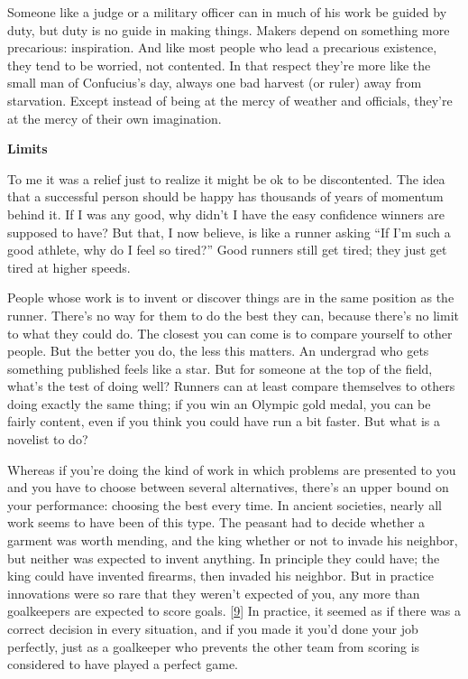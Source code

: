 Someone like a judge or a military officer can in much of his work be
guided by duty, but duty is no guide in making things. Makers depend on
something more precarious: inspiration. And like most people who lead a
precarious existence, they tend to be worried, not contented. In that
respect they're more like the small man of Confucius's day, always one
bad harvest (or ruler) away from starvation. Except instead of being at
the mercy of weather and officials, they're at the mercy of their own
imagination.

\textbf{Limits}

To me it was a relief just to realize it might be ok to be discontented.
The idea that a successful person should be happy has thousands of years
of momentum behind it. If I was any good, why didn't I have the easy
confidence winners are supposed to have? But that, I now believe, is
like a runner asking ``If I'm such a good athlete, why do I feel so
tired?'' Good runners still get tired; they just get tired at higher
speeds.

People whose work is to invent or discover things are in the same
position as the runner. There's no way for them to do the best they can,
because there's no limit to what they could do. The closest you can come
is to compare yourself to other people. But the better you do, the less
this matters. An undergrad who gets something published feels like a
star. But for someone at the top of the field, what's the test of doing
well? Runners can at least compare themselves to others doing exactly
the same thing; if you win an Olympic gold medal, you can be fairly
content, even if you think you could have run a bit faster. But what is
a novelist to do?

Whereas if you're doing the kind of work in which problems are presented
to you and you have to choose between several alternatives, there's an
upper bound on your performance: choosing the best every time. In
ancient societies, nearly all work seems to have been of this type. The
peasant had to decide whether a garment was worth mending, and the king
whether or not to invade his neighbor, but neither was expected to
invent anything. In principle they could have; the king could have
invented firearms, then invaded his neighbor. But in practice
innovations were so rare that they weren't expected of you, any more
than goalkeepers are expected to score goals. {[}\hyperref[f9n]{9}{]} In
practice, it seemed as if there was a correct decision in every
situation, and if you made it you'd done your job perfectly, just as a
goalkeeper who prevents the other team from scoring is considered to
have played a perfect game.


